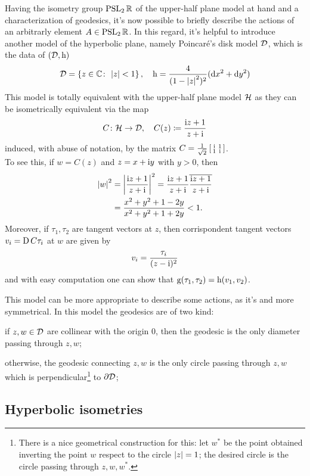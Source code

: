 Having the isometry group $\operatorname{PSL}_{2}\mathbb{R}$ of the upper-half plane model at hand and a characterization of geodesics, it's now possible to briefly describe the actions of an arbitrarly element $A\in\operatorname{PSL}_{2}\mathbb{R}$. In this regard, it's helpful to introduce another model of the hyperbolic plane, namely Poincaré's disk model $\mathcal{D}$, which is the data of $(\mathcal{D},\mathrm{h})$
\[
\mathcal{D}=\left\{
z\in\mathbb{C}\colon\,\left| z\right|<1
\right\},\quad \mathrm{h}=\frac{4}{(1-\left| z\right|^{2})^{2}}(\mathop{}\!\mathrm{d} x^{2}+\mathop{}\!\mathrm{d} y^{2})
\]
This model is totally equivalent with the upper-half plane model $\mathcal{H}$ as they can be isometrically equivalent via the map 
\[
C\colon\mathcal{H}\to\mathcal{D},\quad C(z)\coloneqq\frac{\mathrm{i} z+1}{z+\mathrm{i}}
\]
induced, with abuse of notation, by the matrix $C=\frac{1}{\sqrt{2}}\left[\begin{smallmatrix} \mathrm{i}&1\\1&\mathrm{i} \end{smallmatrix}\right]$.\\

To see this, if $w=C(z)$ and $z=x+\mathrm{i} y$ with $y>0$, then
\begin{align*}
\left| w\right|^{2}&=\left| \frac{\mathrm{i} z+1}{z+\mathrm{i}}\right|^{2}=\frac{\mathrm{i} z+1}{z+\mathrm{i}}\overline{\frac{\mathrm{i} z+1}{z+\mathrm{i}}}\\
&=\frac{x^{2}+y^{2}+1-2y}{x^{2}+y^{2}+1+2y}<1.
\end{align*}
Moreover, if $\tau_{1},\tau_{2}$ are tangent vectors at $z$, then corrispondent tangent vectors $v_{i}=\operatorname{D}C \tau_{i}$ at $w$ are given by
\[
v_{i}=\frac{\tau_{i}}{(z-\mathrm{i})^{2}}
\]
and with easy computation one can show that $\mathrm{g}(\tau_{1},\tau_{2})=\mathrm{h}(v_{1},v_{2})$.

This model can be more appropriate to describe some actions, as it's  and more symmetrical. In this model the geodesics are of two kind:
\begin{compactitem}
\item if $z,w\in\mathcal{D}$ are collinear with the origin $0$, then the geodesic is the only diameter passing through $z,w$;
\item otherwise, the geodesic connecting $z,w$ is the only circle passing through $z,w$ which is perpendicular\footnote{There is a nice geometrical construction for this: let $w^{\ast}$ be the point obtained inverting the point $w$ respect to the circle $\left| z\right|=1$; the desired circle is the circle passing through $z,w,w^{\ast}$.} to $\partial\mathcal{D}$;
\end{compactitem}

\subsection{Hyperbolic isometries}

